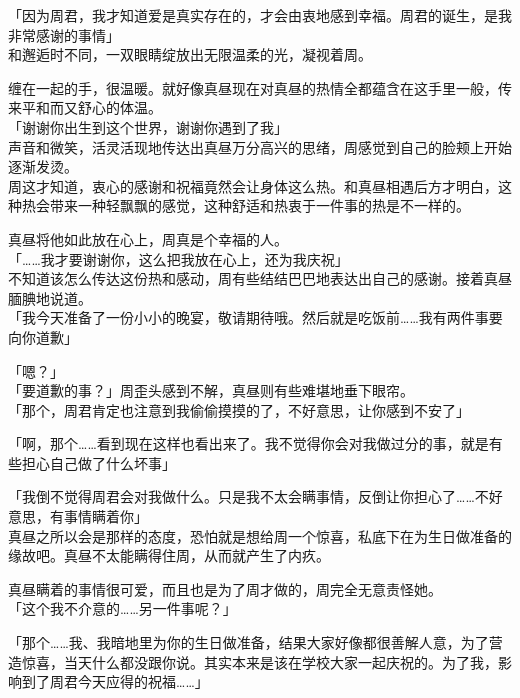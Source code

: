 「因为周君，我才知道爱是真实存在的，才会由衷地感到幸福。周君的诞生，是我非常感谢的事情」\\

和邂逅时不同，一双眼睛绽放出无限温柔的光，凝视着周。

缠在一起的手，很温暖。就好像真昼现在对真昼的热情全都蕴含在这手里一般，传来平和而又舒心的体温。\\

「谢谢你出生到这个世界，谢谢你遇到了我」\\

声音和微笑，活灵活现地传达出真昼万分高兴的思绪，周感觉到自己的脸颊上开始逐渐发烫。\\

周这才知道，衷心的感谢和祝福竟然会让身体这么热。和真昼相遇后方才明白，这种热会带来一种轻飘飘的感觉，这种舒适和热衷于一件事的热是不一样的。

真昼将他如此放在心上，周真是个幸福的人。\\

「……我才要谢谢你，这么把我放在心上，还为我庆祝」\\

不知道该怎么传达这份热和感动，周有些结结巴巴地表达出自己的感谢。接着真昼腼腆地说道。\\

「我今天准备了一份小小的晚宴，敬请期待哦。然后就是吃饭前……我有两件事要向你道歉」

「嗯？」\\

「要道歉的事？」周歪头感到不解，真昼则有些难堪地垂下眼帘。\\

「那个，周君肯定也注意到我偷偷摸摸的了，不好意思，让你感到不安了」

「啊，那个……看到现在这样也看出来了。我不觉得你会对我做过分的事，就是有些担心自己做了什么坏事」

「我倒不觉得周君会对我做什么。只是我不太会瞒事情，反倒让你担心了……不好意思，有事情瞒着你」\\

真昼之所以会是那样的态度，恐怕就是想给周一个惊喜，私底下在为生日做准备的缘故吧。真昼不太能瞒得住周，从而就产生了内疚。

真昼瞒着的事情很可爱，而且也是为了周才做的，周完全无意责怪她。\\

「这个我不介意的……另一件事呢？」

「那个……我、我暗地里为你的生日做准备，结果大家好像都很善解人意，为了营造惊喜，当天什么都没跟你说。其实本来是该在学校大家一起庆祝的。为了我，影响到了周君今天应得的祝福……」

